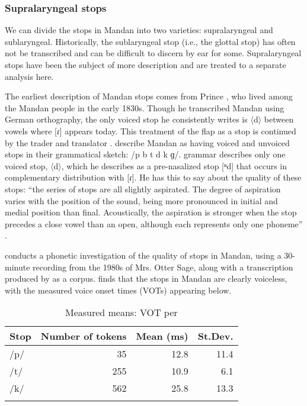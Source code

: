 \subsubsection{Supralaryngeal stops}\label{supraplosives}

We can divide the stops in Mandan into two varieties: supralaryngeal and sublaryngeal. Historically, the sublaryngeal stop (i.e., the glottal stop) has often not be transcribed and can be difficult to discern by ear for some. Supralaryngeal stops have been the subject of more description and are treated to a separate analysis here.

The earliest description of Mandan stops comes from Prince \citet{maximilian1839}, who lived among the Mandan people in the early 1830s. Though he transcribed Mandan using German orthography, the only voiced stop he consistently writes is $\langle$d$\rangle$ between vowels where [ɾ] appears today. This treatment of the flap as a stop is continued by the trader and translator \citet{kipp1852}. \citet{will1906} describe Mandan as having voiced and unvoiced stops in their grammatical sketch: /p b t d k ɡ/.  grammar describes only one voiced stop, $\langle$d$\rangle$, which he describes as a pre-nasalized stop [ⁿd] that occurs in complementary distribution with [ɾ]. He has this to say about the quality of these stops: ``the series of stops are all slightly aspirated. The degree of aspiration varies with the position of the sound, being more pronounced in initial and medial position than final. Acoustically, the aspiration is stronger when the stop precedes a close vowel than an open, although each represents only one phoneme'' \citep[2]{kennard1936}.

\citet{torres2013a} conducts a phonetic investigation of the quality of stops in Mandan, using a 30-minute recording from the 1980s of Mrs. Otter Sage, along with a transcription produced by \citet{trechteretal2009} as a corpus. \citeauthor{torres2013a} finds that the stops in Mandan are clearly voiceless, with the measured voice onset times (VOTs) appearing below.

\begin{table}
\begin{center}
\caption{Measured means: VOT per \citet[29]{torres2013a}}
\label{torresVOT}
\begin{tabular}{lrrr}
\lsptoprule
{Stop}	&	{Number of tokens} 	&	{Mean (ms)}	&	{St.Dev.}\\
\midrule
{/p/}	&	35	&	12.8	&	11.4\\
{/t/}	&	255&	10.9	&	6.1\\
{/k/}	&	562&	25.8	&	13.3\\
\lspbottomrule
\end{tabular}
\end{center}
\end{table}



